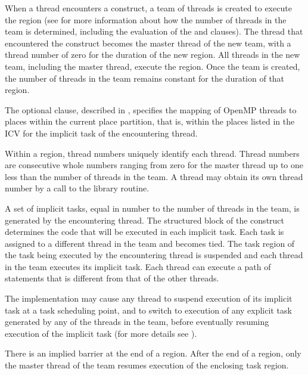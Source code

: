 \descr
When a thread encounters a  construct, a team of threads is created to
execute the  region (see
for more information about how the number of threads in the team is determined, 
including the evaluation of the  and  clauses). The 
thread that encountered the  construct becomes the master thread 
of the new team, with a thread number of zero for the duration of the new 
 region. All threads in the new team, including the master thread, 
execute the region. Once the team is created, the number of threads in the
team remains constant for the duration of that  region.

The optional  clause, described in
, specifies the mapping of 
OpenMP threads to places within the current place partition, that is, within
the places listed in the  ICV for the implicit task 
of the encountering thread.

Within a  region, thread numbers uniquely identify each thread. Thread
numbers are consecutive whole numbers ranging from zero for the master thread up to
one less than the number of threads in the team. A thread may obtain its own thread
number by a call to the  library routine.

A set of implicit tasks, equal in number to the number of threads in the team, is
generated by the encountering thread. The structured block of the  
construct determines the code that will be executed in each implicit task. Each 
task is assigned to a different thread in the team and becomes tied. The task region 
of the task being executed by the encountering thread is suspended and each thread 
in the team executes its implicit task. Each thread can execute a path of statements 
that is different from that of the other threads.

The implementation may cause any thread to suspend execution of its implicit task at 
a task scheduling point, and to switch to execution of any explicit task generated by 
any of the threads in the team, before eventually resuming execution of the implicit 
task (for more details see ).

There is an implied barrier at the end of a  region. After the end of a
 region, only the master thread of the team resumes execution of the
enclosing task region.

